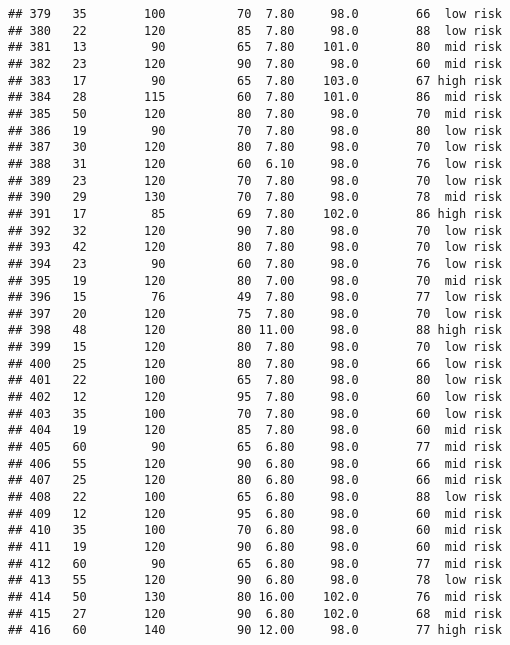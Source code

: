 \documentclass[
  ignorenonframetext,
]{beamer}
\begin{document}
\begin{frame}[fragile]
\begin{verbatim}
## 379   35        100          70  7.80     98.0        66  low risk
## 380   22        120          85  7.80     98.0        88  low risk
## 381   13         90          65  7.80    101.0        80  mid risk
## 382   23        120          90  7.80     98.0        60  mid risk
## 383   17         90          65  7.80    103.0        67 high risk
## 384   28        115          60  7.80    101.0        86  mid risk
## 385   50        120          80  7.80     98.0        70  mid risk
## 386   19         90          70  7.80     98.0        80  low risk
## 387   30        120          80  7.80     98.0        70  low risk
## 388   31        120          60  6.10     98.0        76  low risk
## 389   23        120          70  7.80     98.0        70  low risk
## 390   29        130          70  7.80     98.0        78  mid risk
## 391   17         85          69  7.80    102.0        86 high risk
## 392   32        120          90  7.80     98.0        70  low risk
## 393   42        120          80  7.80     98.0        70  low risk
## 394   23         90          60  7.80     98.0        76  low risk
## 395   19        120          80  7.00     98.0        70  mid risk
## 396   15         76          49  7.80     98.0        77  low risk
## 397   20        120          75  7.80     98.0        70  low risk
## 398   48        120          80 11.00     98.0        88 high risk
## 399   15        120          80  7.80     98.0        70  low risk
## 400   25        120          80  7.80     98.0        66  low risk
## 401   22        100          65  7.80     98.0        80  low risk
## 402   12        120          95  7.80     98.0        60  low risk
## 403   35        100          70  7.80     98.0        60  low risk
## 404   19        120          85  7.80     98.0        60  mid risk
## 405   60         90          65  6.80     98.0        77  mid risk
## 406   55        120          90  6.80     98.0        66  mid risk
## 407   25        120          80  6.80     98.0        66  mid risk
## 408   22        100          65  6.80     98.0        88  low risk
## 409   12        120          95  6.80     98.0        60  mid risk
## 410   35        100          70  6.80     98.0        60  mid risk
## 411   19        120          90  6.80     98.0        60  mid risk
## 412   60         90          65  6.80     98.0        77  mid risk
## 413   55        120          90  6.80     98.0        78  low risk
## 414   50        130          80 16.00    102.0        76  mid risk
## 415   27        120          90  6.80    102.0        68  mid risk
## 416   60        140          90 12.00     98.0        77 high risk

\end{verbatim}
\end{frame}
\end{document}
